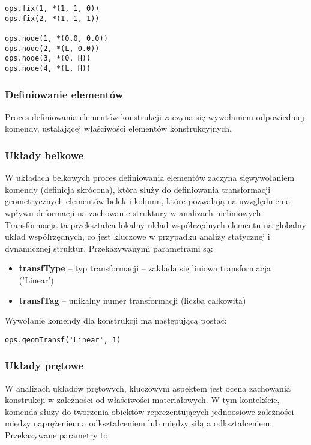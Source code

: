 \begin{lstlisting}
ops.fix(1, *(1, 1, 0))
ops.fix(2, *(1, 1, 1))

ops.node(1, *(0.0, 0.0))
ops.node(2, *(L, 0.0))
ops.node(3, *(0, H))
ops.node(4, *(L, H))
\end{lstlisting}

\subsubsection{Definiowanie elementów}

Proces definiowania elementów konstrukcji zaczyna się wywołaniem odpowiedniej komendy, ustalającej właściwości elementów konstrukcyjnych.

\subsubsection*{Układy belkowe}

W układach belkowych proces definiowania elementów zaczyna sięwywołaniem komendy  (definicja skrócona),
która służy do definiowania transformacji geometrycznych elementów belek i kolumn, które pozwalają na uwzględnienie wpływu
deformacji na zachowanie struktury w analizach nieliniowych. Transformacja ta przekształca lokalny układ współrzędnych elementu na globalny układ współrzędnych, co jest kluczowe w przypadku analizy statycznej i dynamicznej struktur.
Przekazywanymi parametrami są:

\begin{itemize}
    \item \textbf{transfType} – typ transformacji – zakłada się liniowa transformacja ('Linear')
    \item \textbf{transfTag} – unikalny numer transformacji (liczba całkowita)
\end{itemize}

Wywołanie komendy dla konstrukcji ma następującą postać:

\begin{lstlisting}
ops.geomTransf('Linear', 1)
\end{lstlisting}

\subsubsection*{Układy prętowe}

W analizach układów prętowych, kluczowym aspektem jest ocena zachowania konstrukcji w zależności od właściwości materiałowych.
W tym kontekście, komenda   służy do tworzenia obiektów reprezentujących
jednoosiowe zależności między naprężeniem a odkształceniem lub między siłą a odkształceniem.
Przekazywane parametry to:

